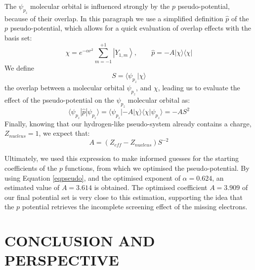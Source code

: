 \documentclass[12pt]{article}
\begin{document}
The \(\psi_{p_{z}}\) molecular orbital is influenced strongly by the $p$ pseudo-potential,
because of their overlap. In this paragraph we use a simplified definition $\widehat{p}$ of the $p$ pseudo-potential, which allows for a quick evaluation of overlap effects with the basis set: 
\begin{equation}
\chi = e^{-\alpha r^{2}}\sum_{m=-1}^{+1}\left|Y_{1,m}\right>,\qquad \widehat{p} = -A | \chi \rangle \langle \chi |
\end{equation}
We define
\begin{equation}
S = \langle \psi_{p_{z}} | \chi \rangle
\end{equation}
the overlap between a molecular orbital \(\psi_{p_{z}}\), and \(\chi\),
leading us to evaluate the effect of the pseudo-potential on the \(\psi_{p_{z}}\) molecular orbital as:
\begin{equation}
\langle \psi_{p_{z}} | \widehat{p} | \psi_{p_{z}} \rangle = \langle \psi_{p_{z}} | -A | \chi \rangle \langle \chi | \psi_{p_{z}} \rangle = -A S^{2}
\end{equation}
Finally, knowing that our hydrogen-like pseudo-system already contains a charge, \(Z_{nucleus}=1\), 
we expect that:
\begin{equation}
A = (Z_{eff} - Z_{nucleus})S^{-2}
\label{eqpseudo}
\end{equation}

Ultimately, we used this expression to make informed guesses for the starting coefficients of the $p$ functions, from which we optimised the pseudo-potential.
By using Equation \ref{eqpseudo}, and the optimised exponent of $\alpha=0.624$, an estimated value of $A=3.614$ is obtained.  
The optimised coefficient $A=3.909$ of our final potential set is very close to this estimation, 
supporting the idea that the $p$ potential retrieves the incomplete screening effect of the missing electrons. 

\section*{\sffamily \Large CONCLUSION AND PERSPECTIVE}
\end{document}
